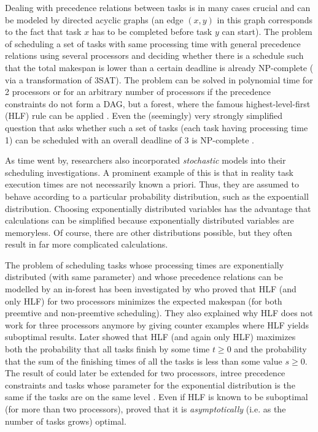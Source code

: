 Dealing with precedence relations between tasks is in many cases crucial and can be modeled by directed acyclic graphs (an edge $(x,y)$ in this graph corresponds to the fact that task $x$ has to be completed before task $y$ can start). The problem of scheduling a set of tasks with same processing time with general precedence relations using several processors and deciding whether there is a schedule such that the total makespan is lower than a certain deadline is already NP-complete (\cite{Ullman:1975:NSP:1739944.1740138} via a transformation of 3SAT). The problem can be solved in polynomial time for 2 processors \cite{coffman-graham-famous-two-proc-result} or for an arbitrary number of processors if the precedence constraints do not form a DAG, but a forest, where the famous highest-level-first (HLF) rule can be applied \cite{hu:1961:hlfoptimalforknowntimesintree}. Even the (seemingly) very strongly simplified question that asks whether such a set of tasks (each task having processing time 1) can be scheduled with an overall deadline of 3 is NP-complete \cite{lenstra-kan-1978}.

As time went by, researchers also incorporated \emph{stochastic} models into their scheduling investigations. A prominent example of this is that in reality task execution times are not necessarily known a priori. Thus, they are assumed to behave according to a particular probability distribution, such as the expoentiall distribution. Choosing exponentially distributed variables has the advantage that calculations can be simplified because exponentially distributed variables are memoryless. Of course, there are other distributions possible, but they often result in far more complicated calculations.

The problem of scheduling tasks whose processing times are exponentially distributed (with same parameter) and whose precedence relations can be modelled by an in-forest has been investigated by \cite{chandyreynoldsshortpaper1975} who proved that HLF (and only HLF) for two processors minimizes the expected makespan (for both preemtive and non-preemtive scheduling). They also explained why HLF does not work for three processors anymore by giving counter examples where HLF yields suboptimal results. Later \cite{bruno-1985} showed that HLF (and again only HLF) maximizes both the probability that all tasks finish by some time $t\geq 0$ and the probability that the sum of the finishing times of all the tasks is less than some value $s\geq 0$. The result of \cite{chandyreynoldsshortpaper1975} could later be extended for two processors, intree precedence constraints and tasks whose parameter for the exponential distribution is the same if the tasks are on the same level \cite{pinedo-weiss}. Even if HLF is known to be suboptimal (for more than two processors), \cite{journals/siamcomp/PapadimitriouT87} proved that it is \emph{asymptotically} (i.e. as the number of tasks grows) optimal.

